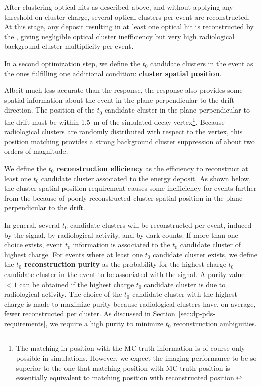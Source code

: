 After clustering optical hits as described above, and without applying any threshold on cluster charge, several optical clusters per event are reconstructed. At this stage, any deposit resulting in at least one optical hit is reconstructed by the , giving negligible  optical cluster inefficiency but very high radiological background cluster multiplicity per event. 

In a second optimization step, we define the $t_0$ candidate clusters in the event as the ones fulfilling one additional condition: {\bf cluster spatial position}.

Albeit much less accurate than the  response, the  response also provides some spatial information about the event in the plane perpendicular to the drift direction. The position of the $t_0$ candidate cluster in the plane perpendicular to the drift must be within \SI{1.5}{\m} of the simulated  decay vertex\footnote{The matching in position with the MC truth information is of course only possible in simulations. However, we expect the  imaging performance to be so superior to the  one that matching  position with MC truth position is essentially equivalent to matching  position with  reconstructed position.}. Because radiological clusters are randomly distributed with respect to the  vertex, this position matching provides a strong background cluster suppression of about two orders of magnitude.

We define the {\bf {} $t_0$ reconstruction efficiency} as the efficiency to reconstruct at least one $t_0$ candidate cluster associated to the  energy deposit. As shown below, the cluster spatial position requirement causes some inefficiency for events farther from the  because of poorly reconstructed cluster spatial position in the plane perpendicular to the drift.

In general, several $t_0$ candidate clusters will be reconstructed per event, induced by the  signal, by radiological activity, and by  dark counts. If more than one choice exists, event $t_0$ information is associated to the $t_0$ candidate cluster of highest charge. For events where at least one $t_0$ candidate cluster exists, we define the {\bf {} $t_0$ reconstruction purity} as the probability for the highest charge $t_0$ candidate cluster in the event to be associated with the  signal. A purity value $<1$ can be obtained if the highest charge $t_0$ candidate cluster is due to radiological activity. The choice of the $t_0$ candidate cluster with the highest charge is made to maximize purity because radiological clusters have, on average, fewer reconstructed  per cluster. As discussed in Section~\ref{sec:dp-pds-requirements}, we require a high purity to minimize $t_0$ reconstruction ambiguities.
%


